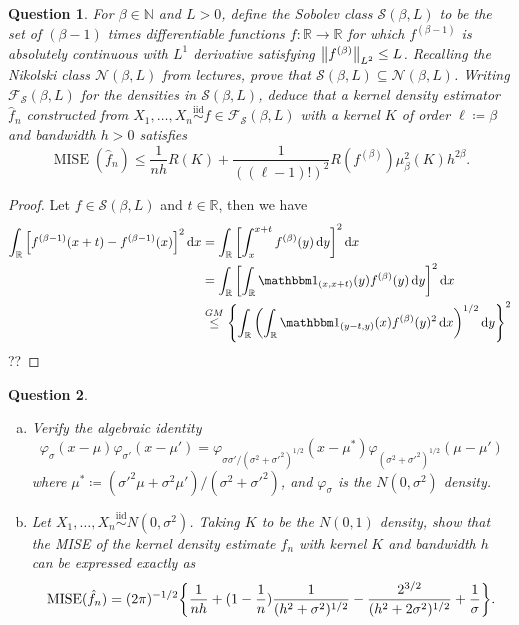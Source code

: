 \documentclass{article}
\theoremstyle{plain}
\newtheorem{question}{Question}
\theoremstyle{remark}
\renewcommand{\phi}{\varphi}
\newcommand{\Bb}{\mathbb}
\newcommand{\Cal}{\mathcal}
\newcommand{\Rm}{\mathrm}
\newcommand{\NN}{\Bb N}
\newcommand{\RR}{\Bb R}
\newcommand\FF{\Cal F}
\newcommand\Nn{\Cal N}
\renewcommand\SS{\Cal S}
\newcommand\ceq\coloneqq %
\newcommand\ind{\mathbbm 1} %
\newcommand\iid{\overset{\Rm{iid}}{\sim}}
\DeclareMathOperator\MISE{MISE}
\begin{document}
\begin{question}
	For $\beta \in \NN$ and $L > 0$, define the \emph{Sobolev class} $\SS(\beta, L)$ to be the set of $(\beta - 1)$ times differentiable functions $f \colon \RR \to \RR$ for which $f^{(\beta - 1)}$ is absolutely continuous with $L^1$ derivative satisfying $\norm{f^{(\beta)}}_{L^2} \leq L$. Recalling the Nikolski class $\Nn(\beta, L)$ from lectures, prove that $\SS(\beta, L) \subseteq \Nn(\beta, L)$. Writing $\FF_\SS(\beta, L)$ for the densities in $\SS(\beta, L)$, deduce that a kernel density estimator $\hat f_n$ constructed from $X_1, \dotsc, X_n \iid f \in \FF_\SS(\beta, L)$ with a kernel $K$ of order $\ell \ceq \beta$ and bandwidth $h > 0$ satisfies
	\[
	\MISE(\hat f_n) \leq \frac1{nh} R(K) + \frac1{((\ell - 1)!)^2} R(f^{(\beta)}) \mu_\beta^2(K) h^{2\beta}. 
	\]
\end{question}

\begin{proof}
	Let $f \in \SS(\beta, L)$ and $t \in \RR$, then we have 
	\begin{align*}
		\int_\RR \qty[f^{(\beta - 1)}(x + t) - f^{(\beta - 1)}(x)]^2 \dd{x} &= \int_\RR \qty[\int_x^{x+t} f^{(\beta)}(y) \dd{y}]^2 \dd{x} \\
		&= \int_\RR \qty[ \int_\RR \ind_{(x, x+t)}(y) f^{(\beta)}(y) \dd{y} ]^2 \dd{x} \\
		&\overset{GM}\leq  \qty{ \int_\RR \qty( \int_\RR \ind_{(y-t, y)}(x) f^{(\beta)}(y)^2 \dd{x})^{1/2} \dd{y}}^2 
	\end{align*}
??
\end{proof}

\begin{question}
	\begin{enumerate}[(a)]
		\item 	Verify the algebraic identity
		\[
		\phi_\sigma(x-\mu)\phi_{\sigma'}(x-\mu') = \phi_{\sigma\sigma'/(\sigma^2 + \sigma'^2)^{1/2}}(x - \mu^*) \phi_{(\sigma^2 + \sigma'^2)^{1/2}}(\mu - \mu')
		\]
		where $\mu^* \ceq (\sigma'^2 \mu + \sigma^2\mu') / (\sigma^2 + \sigma'^2)$, and $\phi_\sigma$ is the $N(0, \sigma^2)$ density. 
		
		\item Let $X_1, \dotsc, X_n \iid N(0, \sigma^2)$. Taking $K$ to be the $N(0, 1)$ density, show that the MISE of the kernel density estimate $\hat f_n$ with kernel $K$ and bandwidth $h$ can be expressed exactly as
		\[
		\MISE(\hat f_n) = (2\pi)^{-1/2} \qty{\frac1{nh} + (1 - \frac1n) \frac{1}{(h^2 + \sigma^2)^{1/2}} - \frac{2^{3/2}}{(h^2 + 2\sigma^2)^{1/2}} + \frac1\sigma}. 
		\]
	\end{enumerate}

\end{question}
\end{document}
